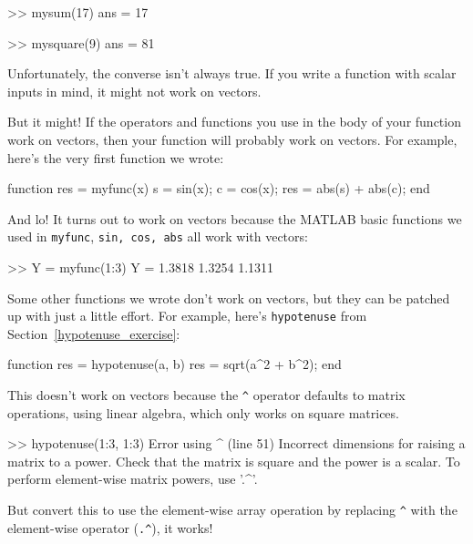 \documentclass[../../book.tex]{subfiles}
\begin{document}

\begin{code}
>> mysum(17)
ans = 17

>> mysquare(9)
ans = 81
\end{code}

Unfortunately, the converse isn't always true.  If you write
a function with scalar inputs in mind, it might not work on vectors.

But it might!  If the operators and functions
you use in the body of your function work on vectors, then your
function will probably work on vectors.
For example, here's the very first function we wrote:

\begin{code}
function res = myfunc(x)
    s = sin(x);
    c = cos(x);
    res = abs(s) + abs(c);
end
\end{code}

And lo!  It turns out to work on vectors because the MATLAB basic functions we used in \lstinline{myfunc}, \lstinline{sin, cos, abs} all work with vectors:

\begin{code}
>> Y = myfunc(1:3)
Y = 1.3818    1.3254    1.1311
\end{code}

Some other functions we wrote don't work on vectors,
but they can be patched up with just a little effort.  For example,
here's \lstinline{hypotenuse} from Section~\ref{hypotenuse_exercise}:

\begin{code}
function res = hypotenuse(a, b)
    res = sqrt(a^2 + b^2);
end
\end{code}

This doesn't work on vectors because the \lstinline{^} operator
defaults to matrix operations, using linear algebra, which only works on
square matrices.


\begin{code}
>> hypotenuse(1:3, 1:3)
Error using  ^  (line 51)
Incorrect dimensions for raising a matrix to a power.
Check that the matrix is square and the power is a scalar.
To perform element-wise matrix powers, use '.^'.
\end{code}

But convert this to use the element-wise array operation by replacing \lstinline{^} with the element-wise operator
(\lstinline{.^}), it works!
\end{document}
